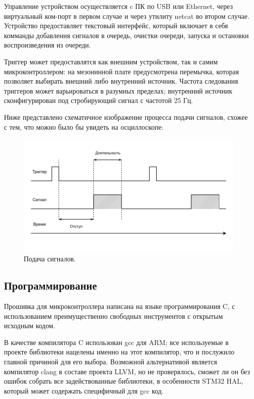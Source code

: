 \documentclass[rusmathsym, eqnumwithinsec, amspack, hyperref]{bomgost}
\begin{document}
Управление устройством осуществляется c ПК по USB или Ethernet, через виртуальный ком-порт в первом случае и через утилиту netcat во втором случае. Устройство предоставляет текстовый интерфейс, который включает в себя комманды добавления сигналов в очередь, очистки очереди, запуска и остановки воспроизведения из очереди.

\pagebreak

Триггер может предоставлятся как внешним устройством, так и самим микроконтроллером: на мезонинной плате предусмотрена перемычка, которая позволяет выбирать внешний либо внутренний источник. Частота следования триггеров может варьироваться в разумных пределах; внутренний источник сконфигурирован под стробирующий сигнал с частотой 25 Гц.

Ниже представлено схематичное изображение процесса подачи сигналов, схожее с тем, что можно было бы увидеть на осциллоскопе:

%
%
\begin{gostfigure}
\begin{figure}[H]
\centering
\includegraphics{data/timing_diagram.drawio.pdf}
\caption{Подача сигналов.}
\label{fig:timing_diagram}
\end{figure}
\end{gostfigure}

\subsection{Программирование}

Прошивка для микроконтроллера написана на языке программирования C, с использованием преимущественно свободных инструментов с открытым исходным кодом.

В качестве компилятора C использован gcc для ARM; все используемые в проекте библиотеки нацелены именно на этот компилятор, что и послужило главной причиной для его выбора. Возможной альтернативой является компилятор clang в составе проекта LLVM, но не проверялось, сможет ли он без ошибок собрать все задействованные библиотеки, в особенности STM32 HAL, который может содержать специфичный для gcc код.
\end{document}
